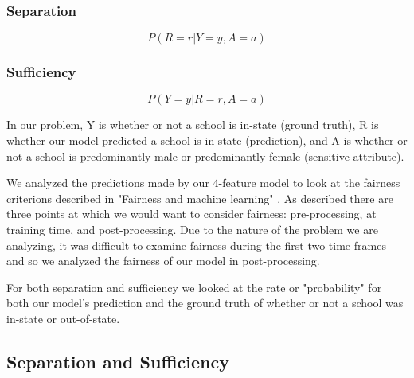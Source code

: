 \documentclass{article}
\begin{document}
\subsubsection*{Separation}
\[
P(R=r | Y=y, A=a) \label{eq:separation} \tag{1}
\]
\subsubsection*{Sufficiency}
\[
P(Y=y | R=r, A=a) \label{eq:sufficiency} \tag{2}
\]

In our problem, Y is whether or not a school is in-state (ground truth), R is whether our model predicted a school is in-state (prediction), and A is whether or not a school is predominantly male or predominantly female (sensitive attribute).

We analyzed the predictions made by our 4-feature model to look at the fairness criterions described in "Fairness and machine learning" \cite{barocas-hardt-narayanan}. As described there are three points at which we would want to consider fairness: pre-processing, at training time, and post-processing. Due to the nature of the problem we are analyzing, it was difficult to examine fairness during the first two time frames and so we analyzed the fairness of our model in post-processing.

For both separation and sufficiency we looked at the rate or "probability" for both our model's prediction and the ground truth of whether or not a school was in-state or out-of-state.  

\subsection{Separation and Sufficiency}
\end{document}
